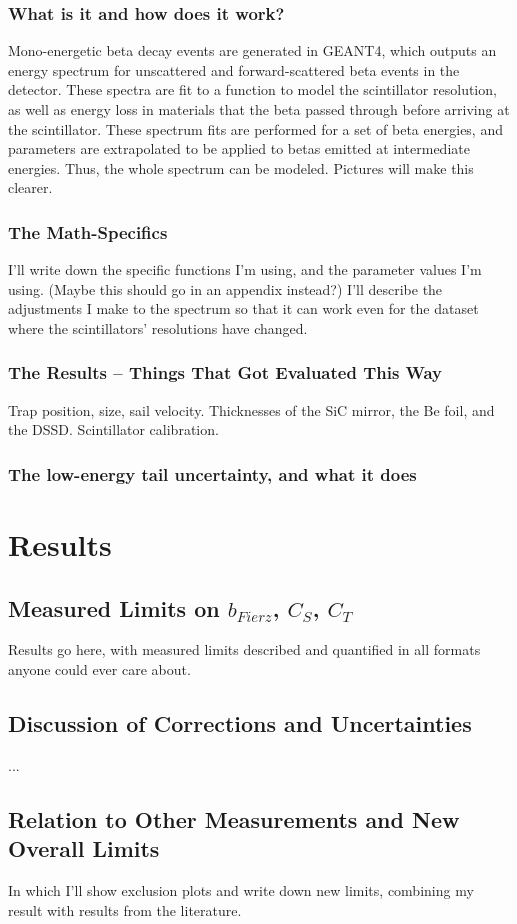 	\subsection{What is it and how does it work?}
	Mono-energetic beta decay events are generated in GEANT4, which outputs an energy spectrum for unscattered and forward-scattered beta events in the detector.  These spectra are fit to a function to model the scintillator resolution, as well as energy loss in materials that the beta passed through before arriving at the scintillator.  These spectrum fits are performed for a set of beta energies, and parameters are extrapolated to be applied to betas emitted at intermediate energies.  Thus, the whole spectrum can be modeled.  Pictures will make this clearer. 
	
	\subsection{The Math-Specifics}
	I'll write down the specific functions I'm using, and the parameter values I'm using.  (Maybe this should go in an appendix instead?)  I'll describe the adjustments I make to the spectrum so that it can work even for the dataset where the scintillators' resolutions have changed.
	
	\subsection{The Results -- Things That Got Evaluated This Way}
	Trap position, size, sail velocity.  Thicknesses of the SiC mirror, the Be foil, and the DSSD.  Scintillator calibration.  
	
	\subsection{The low-energy tail uncertainty, and what it does}


\clearpage	
\chapter{Results}

\section{Measured Limits on $b_{Fierz}$, $C_S$, $C_T$}
	Results go here, with measured limits described and quantified in all formats anyone could ever care about.
	
\section{Discussion of Corrections and Uncertainties}
	...
	
\section{Relation to Other Measurements and New Overall Limits}
	In which I'll show exclusion plots and write down new limits, combining my result with results from the literature.


